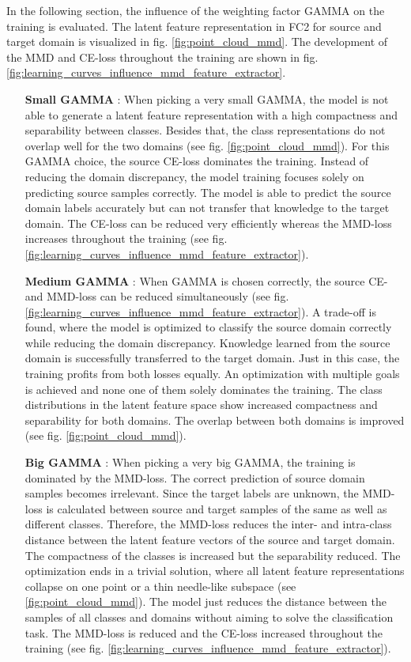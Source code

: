 In the following section, the influence of the weighting factor GAMMA on the training is evaluated. The latent feature representation in FC2 for source and target domain is visualized in fig. \ref{fig:point_cloud_mmd}. The development of the MMD and CE-loss throughout the training are shown in fig. \ref{fig:learning_curves_influence_mmd_feature_extractor}.
\begin{itemize}
    \item [\textbf{Small GAMMA}]:
    When picking a very small GAMMA, the model is not able to generate a latent feature representation with a high compactness and separability between classes. Besides that, the class representations do not overlap well for the two domains (see fig. \ref{fig:point_cloud_mmd}). For this GAMMA choice, the source CE-loss dominates the training. Instead of reducing the domain discrepancy, the model training focuses solely on predicting source samples correctly. The model is able to predict the source domain labels accurately but can not transfer that knowledge to the target domain. The CE-loss can be reduced very efficiently whereas the MMD-loss increases throughout the training (see fig. \ref{fig:learning_curves_influence_mmd_feature_extractor}).
    \item [\textbf{Medium GAMMA}]:
    When GAMMA is chosen correctly, the source CE- and MMD-loss can be reduced simultaneously (see fig. \ref{fig:learning_curves_influence_mmd_feature_extractor}). A trade-off is found, where the model is optimized to classify the source domain correctly while reducing the domain discrepancy. Knowledge learned from the source domain is successfully transferred to the target domain. Just in this case, the training profits from both losses equally. An optimization with multiple goals is achieved and none one of them solely dominates the training. The class distributions in the latent feature space show increased compactness and separability for both domains. The overlap between both domains is improved (see fig. \ref{fig:point_cloud_mmd}).
    \item [\textbf{Big GAMMA}]:
    When picking a very big GAMMA, the training is dominated by the MMD-loss. The correct prediction of source domain samples becomes irrelevant. Since the target labels are unknown, the MMD-loss is calculated between source and target samples of the same as well as different classes. Therefore, the MMD-loss reduces the inter- and intra-class distance between the latent feature vectors of the source and target domain. The compactness of the classes is increased but the separability reduced. The optimization ends in a trivial solution, where all latent feature representations collapse on one point or a thin needle-like subspace (see \ref{fig:point_cloud_mmd}). The model just reduces the distance between the samples of all classes and domains without aiming to solve the classification task. The MMD-loss is reduced and the CE-loss increased throughout the training (see fig. \ref{fig:learning_curves_influence_mmd_feature_extractor}).
\end{itemize}


